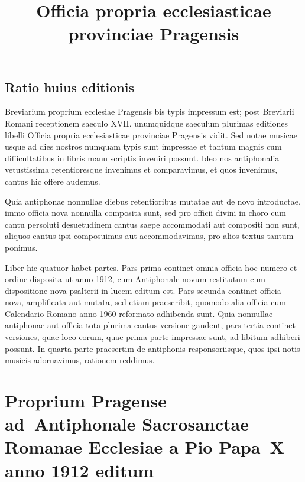 \documentclass[12pt, a5paper, twoside]{book}
\title{Officia propria ecclesiasticae provinciae Pragensis}
\begin{document}
\pagestyle{empty}

\setlength{\parindent}{0.5cm}

\maketitle

\cleardoublepage

\pagestyle{plain}

\chapter*{Ratio huius editionis}

Breviarium proprium ecclesiae Pragensis bis
typis impressum est; post Breviarii Romani receptionem
saeculo XVII. unumquidque saeculum plurimas editiones
libelli Officia propria ecclesiasticae provinciae Pragensis vidit.
Sed notae musicae usque ad dies nostros numquam typis sunt impressae
et tantum magnis cum difficultatibus in libris manu scriptis
inveniri possunt. Ideo nos antiphonalia vetustissima retentioresque
invenimus et comparavimus, et quos invenimus, cantus hic offere
audemus.

Quia antiphonae nonnullae diebus retentioribus mutatae aut de novo
introductae, immo officia nova nonnulla composita sunt,
sed pro officii divini in choro cum cantu persoluti desuetudinem
cantus saepe accommodati aut compositi non sunt,
aliquos cantus ipsi composuimus aut accommodavimus, pro alios
textus tantum ponimus.

Liber hic quatuor habet partes.
Pars prima continet omnia officia hoc numero et ordine disposita
ut anno 1912, cum Antiphonale novum restitutum
cum dispositione nova psalterii in lucem editum est.
Pars secunda continet officia nova, amplificata aut mutata,
sed etiam praescribit, quomodo alia officia cum
Calendario Romano anno 1960 reformato adhibenda sunt.
Quia nonnullae antiphonae aut officia tota plurima cantus versione
gaudent, pars tertia continet versiones, quae loco eorum,
quae prima parte impressae sunt, ad libitum adhiberi possunt.
In quarta parte praesertim de antiphonis responsoriisque,
quos ipsi notis musicis adornavimus, rationem reddimus.

\part{Proprium Pragense ad~Antiphonale Sacrosanctae Romanae Ecclesiae
  a Pio Papa~X anno 1912 editum}
\end{document}
